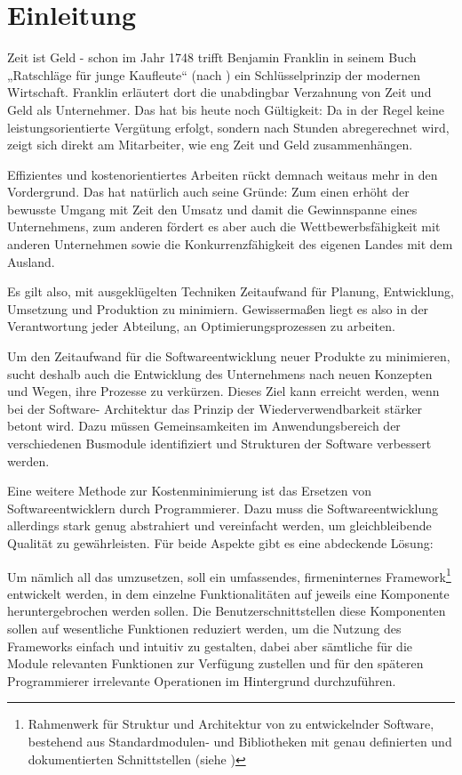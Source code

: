 \thispagestyle{firstPage}

\section{Einleitung}
\label{sec:introduction}

\glqq Zeit ist Geld \grqq- schon im Jahr 1748 trifft Benjamin Franklin in seinem Buch „Ratschläge für junge Kaufleute“  (nach \textcite[][]{ZeitIstGeld.2022}) ein Schlüsselprinzip der modernen Wirtschaft.
Franklin erläutert dort die unabdingbar Verzahnung von Zeit und Geld als Unternehmer. 
Das hat bis heute noch Gültigkeit:
Da in der Regel keine leistungsorientierte Vergütung erfolgt, sondern nach Stunden abregerechnet wird, zeigt sich direkt am Mitarbeiter, wie eng Zeit und Geld zusammenhängen.

Effizientes und kostenorientiertes Arbeiten rückt demnach weitaus mehr in den Vordergrund.
Das hat natürlich auch seine Gründe: Zum einen erhöht der bewusste Umgang mit Zeit den Umsatz und damit die Gewinnspanne eines Unternehmens, zum anderen fördert es aber auch die Wettbewerbsfähigkeit mit anderen Unternehmen sowie die Konkurrenzfähigkeit des eigenen Landes mit dem Ausland.

Es gilt also, mit ausgeklügelten Techniken Zeitaufwand für Planung, Entwicklung, Umsetzung und Produktion zu minimiern. 
Gewissermaßen liegt es also in der Verantwortung jeder Abteilung, an Optimierungsprozessen zu arbeiten.

Um den Zeitaufwand für die Softwareentwicklung neuer Produkte zu minimieren, sucht deshalb auch die Entwicklung des Unternehmens nach neuen Konzepten und Wegen, ihre Prozesse zu verkürzen.
Dieses Ziel kann erreicht werden, wenn bei der Software- Architektur das Prinzip der Wiederverwendbarkeit stärker betont wird.
Dazu müssen Gemeinsamkeiten im Anwendungsbereich der verschiedenen Busmodule identifiziert  und Strukturen der Software verbessert werden.

Eine weitere Methode zur Kostenminimierung ist das Ersetzen von Softwareentwicklern durch Programmierer. Dazu muss die Softwareentwicklung allerdings stark genug abstrahiert und vereinfacht werden, um gleichbleibende Qualität zu gewährleisten.
Für beide Aspekte gibt es eine abdeckende Lösung:

Um nämlich all das umzusetzen, soll ein umfassendes, firmeninternes Framework\footnote{Rahmenwerk für Struktur und Architektur von zu entwickelnder Software, bestehend aus Standardmodulen- und Bibliotheken mit genau definierten und dokumentierten Schnittstellen (siehe \textcite[][1]{ITGlossar.2021})}
entwickelt werden, in dem einzelne Funktionalitäten auf jeweils eine Komponente heruntergebrochen werden sollen. 
Die Benutzerschnittstellen diese Komponenten sollen auf wesentliche Funktionen reduziert werden, um die Nutzung des Frameworks einfach und intuitiv zu gestalten, dabei aber sämtliche für die Module relevanten Funktionen zur Verfügung zustellen und für den späteren Programmierer irrelevante Operationen im Hintergrund durchzuführen.

